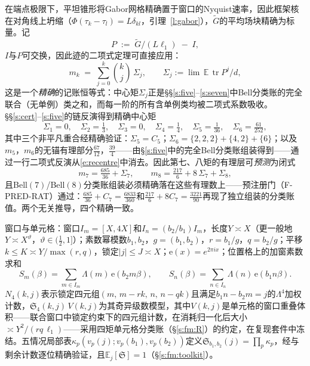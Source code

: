 \documentclass[11pt]{article}
\numberwithin{equation}{section}
\theoremstyle{definition}
\theoremstyle{remark}
\newcommand{\LL}{\Lambda}
\newcommand{\SSS}{\mathfrak{S}}
\newcommand{\e}{\mathrm{e}}
\begin{document}
在端点极限下，平坦锥形将Gabor网格精确置于窗口的Nyquist速率，因此框架核在对角线上坍缩（$\Phi(\tau_k-\tau_l)=L\delta_{kl}$，引理~\ref{l:gabor}），$\widetilde G$的平均场块精确为标量。记
\[
P\;:=\;\widetilde G/(L\ell_1)\;-\;I ,
\]
$I$与$P$可交换，因此迹的二项式定理可直接应用：
\begin{equation}\label{e:recentre}
m_k\;=\;\sum_{j=0}^{k}\binom{k}{j}\,\Sigma_j,
\qquad \Sigma_j:=\lim\,\mathbb E\,
\operatorname{tr}P^{j}/d ,
\end{equation}
这是一个\emph{精确}的记账恒等式：中心矩$\Sigma_j$正是\S\S\ref{s:five}--\ref{s:seven}中Bell分类账的完全联合（无单例）类之和，而每一阶的所有含单例类均被二项式系数吸收。\S\S\ref{s:cert}--\ref{s:five}的链反演得到精确中心矩
\begin{equation}\label{e:sigmas}
\Sigma_1=0,\quad \Sigma_2=\tfrac13,\quad \Sigma_3=0,\quad
\Sigma_4=\tfrac14,\quad \Sigma_5=\tfrac1{36},\quad
\Sigma_6=\tfrac{61}{252},
\end{equation}
其中三个非平凡重合经精确验证：$\Sigma_5=C_5$；$\Sigma_6=\{2,2,2\}+\{4,2\}+\{6\}$；以及$m_5$，$m_6$的无锚有理部分$\tfrac{67}{12}$，$\tfrac{39}4$——由\S\ref{s:five}中的完全Bell分类账组装得到——通过一行二项式反演从\eqref{e:recentre}中消去。因此第七、八矩的有理层可\emph{预测}为闭式
\begin{equation}\label{e:rat78}
m_7=\tfrac{685}{36}+\Sigma_7,
\qquad
m_8=\tfrac{217}{6}+8\,\Sigma_7+\Sigma_8,
\end{equation}
且Bell$(7)$/Bell$(8)$分类账组装必须精确落在这些有理数上——预注册门（F-PRED-RAT）通过：$\tfrac{685}{36}+C_7=\tfrac{6833}{360}$和$\tfrac{217}6+8C_7=\tfrac{3221}{90}$再现了独立组装的分类账值。两个无关推导，四个精确一致。

窗口与单元格：窗口$I_m=[X,4X]$和$I_n=(b_2/b_1)I_m$，长度$Y\asymp X$（更一般地$Y\asymp X^{\vartheta}$，$\vartheta\in(\tfrac12,1]$）；素数幂模数$b_1,b_2$，$g=(b_1,b_2)$，$r=b_1/g$，$q=b_2/g$；平移$k\le K\asymp Y/\max(r,q)$，锁定$|j|\le J\asymp X$；$\e(x)=e^{2\pi ix}$；位置格上的加窗素数求和
\[
S_m(\beta)=\sum_{m\in I_m}\LL(m)\,\e(b_2m\beta),
\qquad
S_n(\beta)=\sum_{n\in I_n}\LL(n)\,\e(b_1n\beta).
\]
$N_4(k,j)$表示锁定四元组$(m,\,m-rk,\,n,\,n-qk)$且满足$b_1n-b_2m=j$的$\LL^4$加权计数，$\SSS_4(k,j)\,V(k,j)$为其奇异级数模型，其中$V(k,j)$是单元格的窗口重叠体积——联合窗口中锁定约束下的四元组计数，在消耗归一化后大小$\asymp Y^{2}/(rq\,\ell_1)$——采用四矩单元格分类账（\S\ref{s:fm:R}）的约定，在复现套件中冻结。五情况局部表$\kappa_p(v_p(j);v_p(b_1),v_p(b_2))$定义$\SSS_{b_1,b_2}(j)=\prod_p\kappa_p$，经与剩余计数逐位精确验证，且$\mathbb E_j[\SSS]=1$（\S\ref{s:fm:toolkit}）。
\end{document}
